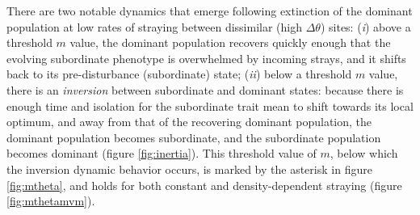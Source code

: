 \documentclass{revtex4}
\begin{document}
There are two notable dynamics that emerge following extinction of the dominant population at low rates of straying between dissimilar (high $\Delta\theta$) sites:
(\emph{i}) above a threshold $m$ value, the dominant population recovers quickly enough that the evolving subordinate phenotype is overwhelmed by incoming strays, and it shifts back to its pre-disturbance (subordinate) state;
(\emph{ii}) below a threshold $m$ value, there is an \emph{inversion} between subordinate and dominant states: because there is enough time and isolation for the subordinate trait mean to shift towards its local optimum, and away from that of the recovering dominant population, the dominant population becomes subordinate, and the subordinate population becomes dominant (figure \ref{fig:inertia}).
This threshold value of $m$, below which the inversion dynamic behavior occurs, is marked by the asterisk in figure \ref{fig:mtheta}, and holds for both constant and density-dependent straying (figure \ref{fig:mthetamvm}).

\end{document}
